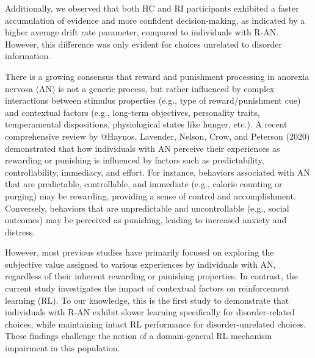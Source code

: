 \documentclass[
  man,floatsintext]{apa6}
\begin{document}
Additionally, we observed that both HC and RI participants exhibited a faster accumulation of evidence and more confident decision-making, as indicated by a higher average drift rate parameter, compared to individuals with R-AN. However, this difference was only evident for choices unrelated to disorder information.

There is a growing consensus that reward and punishment processing in anorexia nervosa (AN) is not a generic process, but rather influenced by complex interactions between stimulus properties (e.g., type of reward/punishment cue) and contextual factors (e.g., long-term objectives, personality traits, temperamental dispositions, physiological states like hunger, etc.). A recent comprehensive review by @Haynos, Lavender, Nelson, Crow, and Peterson (2020) demonstrated that how individuals with AN perceive their experiences as rewarding or punishing is influenced by factors such as predictability, controllability, immediacy, and effort. For instance, behaviors associated with AN that are predictable, controllable, and immediate (e.g., calorie counting or purging) may be rewarding, providing a sense of control and accomplishment. Conversely, behaviors that are unpredictable and uncontrollable (e.g., social outcomes) may be perceived as punishing, leading to increased anxiety and distress.

However, most previous studies have primarily focused on exploring the subjective value assigned to various experiences by individuals with AN, regardless of their inherent rewarding or punishing properties. In contrast, the current study investigates the impact of contextual factors on reinforcement learning (RL). To our knowledge, this is the first study to demonstrate that individuals with R-AN exhibit slower learning specifically for disorder-related choices, while maintaining intact RL performance for disorder-unrelated choices. These findings challenge the notion of a domain-general RL mechanism impairment in this population.
\end{document}
